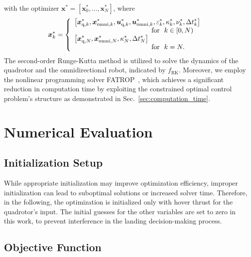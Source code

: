 \documentclass[conference,preprint]{IEEEtran}
\begin{document}
with the optimizer $\bm{x}^*={\left[ \bm{x}_{0}^*, \ldots ,\bm{x}_{N}^*\right]}$,
where 
\begin{equation*}
  \label{eq:grasping_opt_variables_1}	
  \renewcommand{\arraystretch}{1}
	\bm{x}_k^* = \left\{ \begin{array}{ll}
		\displaystyle \left[\bm{x}_{\text{q},k}^*, \bm{x}_{\text{omni},k}^*, \bm{u}_{\text{q},k}^*, \bm{u}_{\text{omni},k}^*, \varepsilon_k^*, \kappa_{k}^*,\nu_k^*, \Delta t_k^*\right] \\
    \hspace{4cm} \text{for} \ \ k\in[0,N) 
    \\
		\displaystyle \left[\bm{x}_{\text{q},N}^*, \bm{x}_{\text{omni},N}^*,\kappa_{N}^*, \Delta t_N^* \right] 
    \\ 
    \hspace{4cm}\text{for}\ \ k=N.
	\end{array} \right.
\end{equation*}
The second-order Runge-Kutta method is utilized to solve the dynamics of the quadrotor and the omnidirectional robot, indicated by $f_\text{RK}$.
Moreover, we employ the nonlinear programming solver \textsc{FATROP}~\cite{Vanroye2023}, which achieves a significant reduction in computation time by exploiting the constrained optimal control problem's structure as demonstrated in Sec.~\ref{sec:computation_time}.

\section{Numerical Evaluation}
\label{sec:numerical_evaluation}

\subsection{Initialization Setup}
\label{sec:initialization_setup}
While appropriate initialization may improve optimization efficiency, improper initialization can lead to suboptimal solutions or increased solver time. 
Therefore, in the following, the optimization is initialized only with hover thrust for the quadrotor's input. 
The initial guesses for the other variables are set to zero in this work, to prevent interference in the landing decision-making process.

\subsection{Objective Function}
\label{sec:objective_function}
\end{document}
